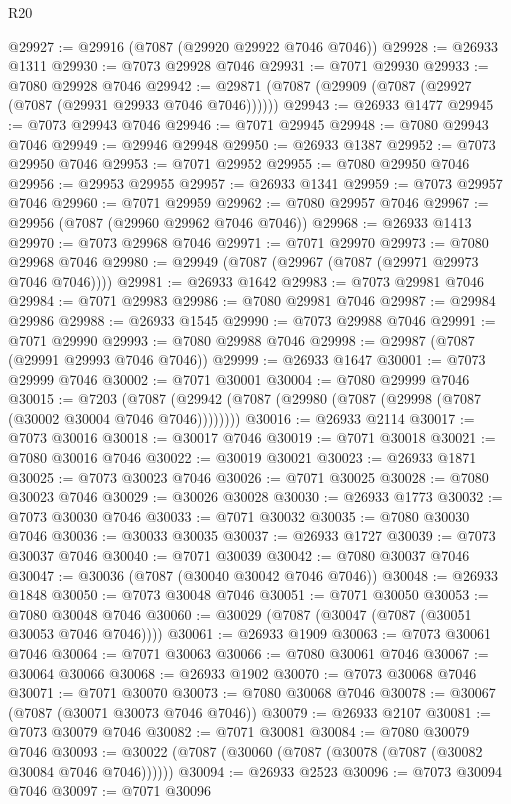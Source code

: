 \begin{lexlean}{R20}
\begin{coremodule}
{@29927 := @29916 (@7087 (@29920 @29922 @7046 @7046))
@29928 := @26933 @1311
@29930 := @7073 @29928 @7046
@29931 := @7071 @29930
@29933 := @7080 @29928 @7046
@29942 := @29871 (@7087 (@29909 (@7087 (@29927 (@7087 (@29931 @29933 @7046 @7046))))))
@29943 := @26933 @1477
@29945 := @7073 @29943 @7046
@29946 := @7071 @29945
@29948 := @7080 @29943 @7046
@29949 := @29946 @29948
@29950 := @26933 @1387
@29952 := @7073 @29950 @7046
@29953 := @7071 @29952
@29955 := @7080 @29950 @7046
@29956 := @29953 @29955
@29957 := @26933 @1341
@29959 := @7073 @29957 @7046
@29960 := @7071 @29959
@29962 := @7080 @29957 @7046
@29967 := @29956 (@7087 (@29960 @29962 @7046 @7046))
@29968 := @26933 @1413
@29970 := @7073 @29968 @7046
@29971 := @7071 @29970
@29973 := @7080 @29968 @7046
@29980 := @29949 (@7087 (@29967 (@7087 (@29971 @29973 @7046 @7046))))
@29981 := @26933 @1642
@29983 := @7073 @29981 @7046
@29984 := @7071 @29983
@29986 := @7080 @29981 @7046
@29987 := @29984 @29986
@29988 := @26933 @1545
@29990 := @7073 @29988 @7046
@29991 := @7071 @29990
@29993 := @7080 @29988 @7046
@29998 := @29987 (@7087 (@29991 @29993 @7046 @7046))
@29999 := @26933 @1647
@30001 := @7073 @29999 @7046
@30002 := @7071 @30001
@30004 := @7080 @29999 @7046
@30015 := @7203
    (@7087 (@29942 (@7087 (@29980 (@7087 (@29998 (@7087 (@30002 @30004 @7046 @7046))))))))
@30016 := @26933 @2114
@30017 := @7073 @30016
@30018 := @30017 @7046
@30019 := @7071 @30018
@30021 := @7080 @30016 @7046
@30022 := @30019 @30021
@30023 := @26933 @1871
@30025 := @7073 @30023 @7046
@30026 := @7071 @30025
@30028 := @7080 @30023 @7046
@30029 := @30026 @30028
@30030 := @26933 @1773
@30032 := @7073 @30030 @7046
@30033 := @7071 @30032
@30035 := @7080 @30030 @7046
@30036 := @30033 @30035
@30037 := @26933 @1727
@30039 := @7073 @30037 @7046
@30040 := @7071 @30039
@30042 := @7080 @30037 @7046
@30047 := @30036 (@7087 (@30040 @30042 @7046 @7046))
@30048 := @26933 @1848
@30050 := @7073 @30048 @7046
@30051 := @7071 @30050
@30053 := @7080 @30048 @7046
@30060 := @30029 (@7087 (@30047 (@7087 (@30051 @30053 @7046 @7046))))
@30061 := @26933 @1909
@30063 := @7073 @30061 @7046
@30064 := @7071 @30063
@30066 := @7080 @30061 @7046
@30067 := @30064 @30066
@30068 := @26933 @1902
@30070 := @7073 @30068 @7046
@30071 := @7071 @30070
@30073 := @7080 @30068 @7046
@30078 := @30067 (@7087 (@30071 @30073 @7046 @7046))
@30079 := @26933 @2107
@30081 := @7073 @30079 @7046
@30082 := @7071 @30081
@30084 := @7080 @30079 @7046
@30093 := @30022 (@7087 (@30060 (@7087 (@30078 (@7087 (@30082 @30084 @7046 @7046))))))
@30094 := @26933 @2523
@30096 := @7073 @30094 @7046
@30097 := @7071 @30096
}
\end{coremodule}
\end{lexlean}
